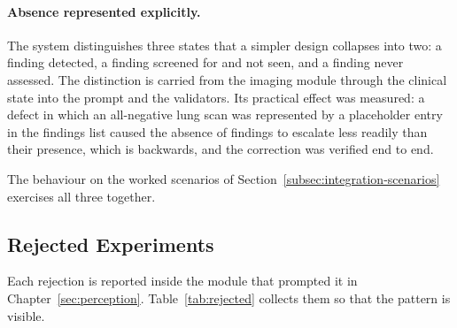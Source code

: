 \paragraph{Absence represented explicitly.} The system distinguishes three states that a
simpler design collapses into two: a finding detected, a finding screened for and not seen,
and a finding never assessed. The distinction is carried from the imaging module through the
clinical state into the prompt and the validators. Its practical effect was measured: a
defect in which an all-negative lung scan was represented by a placeholder entry in the
findings list caused the absence of findings to escalate less readily than their presence,
which is backwards, and the correction was verified end to end.

The behaviour on the worked scenarios of Section~\ref{subsec:integration-scenarios} exercises
all three together.

\subsection{Rejected Experiments}
\label{subsec:results-rejected}

Each rejection is reported inside the module that prompted it in
Chapter~\ref{sec:perception}. Table~\ref{tab:rejected} collects them so that the pattern is
visible.

